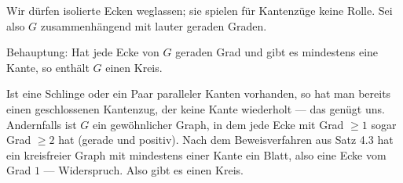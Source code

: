 \begin{merksatz}
Wir dürfen isolierte Ecken weglassen; sie spielen für Kantenzüge keine Rolle. Sei also $G$ zusammenhängend mit lauter geraden Graden.

Behauptung: Hat jede Ecke von $G$ geraden Grad und gibt es mindestens eine Kante, so enthält $G$ einen Kreis.

Ist eine Schlinge oder ein Paar paralleler Kanten vorhanden, so hat man bereits einen geschlossenen Kantenzug, der keine Kante wiederholt --- das genügt uns. Andernfalls ist $G$ ein gewöhnlicher Graph, in dem jede Ecke mit Grad $\ge 1$ sogar Grad $\ge 2$ hat (gerade und positiv). Nach dem Beweisverfahren aus Satz 4.3 hat ein kreisfreier Graph mit mindestens einer Kante ein Blatt, also eine Ecke vom Grad $1$ --- Widerspruch. Also gibt es einen Kreis.
\end{merksatz}

